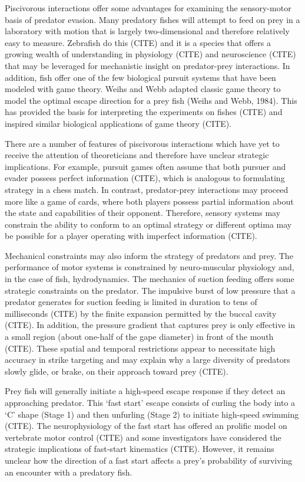 \documentclass[12pt]{article}
\begin{document}
Piscivorous interactions offer some advantages for examining the sensory-motor basis of predator evasion. Many predatory fishes will attempt to feed on prey in a laboratory with motion that is largely two-dimensional and therefore relatively easy to measure. Zebrafish do this (CITE) and it is a species that offers a growing wealth of understanding in physiology (CITE) and neuroscience (CITE) that may be leveraged for mechanistic insight on predator-prey interactions. In addition, fish offer one of the few biological pursuit systems that have been modeled with game theory. Weihs and Webb adapted classic game theory to model the optimal escape direction for a prey fish (Weihs and Webb, 1984). This has provided the basis for interpreting the experiments on fishes (CITE) and inspired similar biological applications of game theory (CITE). 
	
There are a number of features of piscivorous interactions which have yet to receive the attention of theoreticians and therefore have unclear strategic implications. For example, pursuit games often assume that both pursuer and evader possess perfect information (CITE), which is analogous to formulating strategy in a chess match. In contrast, predator-prey interactions may proceed more like a game of cards, where both players possess partial information about the state and capabilities of their opponent. Therefore, sensory systems may constrain the ability to conform to an optimal strategy or different optima may be possible for a player operating with imperfect information (CITE). 

Mechanical constraints may also inform the strategy of predators and prey. The performance of motor systems is constrained by neuro-muscular physiology and, in the case of fish, hydrodynamics. The mechanics of suction feeding offers some strategic constraints on the predator. The impulsive burst of low pressure that a predator generates for suction feeding is limited in duration to tens of milliseconds (CITE) by the finite expansion permitted by the buccal cavity (CITE). In addition, the pressure gradient that captures prey is only effective in a small region (about one-half of the gape diameter) in front of the mouth (CITE). These spatial and temporal restrictions appear to necessitate high accuracy in strike targeting and may explain why a large diversity of predators slowly glide, or brake, on their approach toward prey (CITE). 

Prey fish will generally initiate a high-speed escape response if they detect an approaching predator. This ‘fast start’ escape consists of curling the body into a ‘C’ shape (Stage 1) and then unfurling (Stage 2) to initiate high-speed swimming (CITE). The neurophysiology of the fast start has offered an prolific model on vertebrate motor control (CITE) and some investigators have considered the strategic implications of fast-start kinematics (CITE). However, it remains unclear how the direction of a fast start affects a prey’s probability of surviving an encounter with a predatory fish. 
\end{document}
